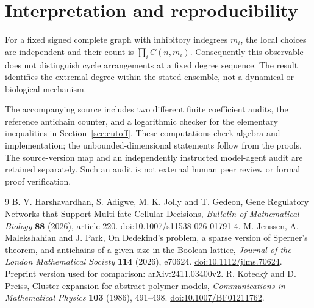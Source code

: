 \documentclass[11pt]{article}
\theoremstyle{remark}\newtheorem{remark}[theorem]{Remark}
\begin{document}
\section{Interpretation and reproducibility}
For a fixed signed complete graph with inhibitory indegrees $m_i$, the
local choices are independent and their count is $\prod_i C(n,m_i)$.
Consequently this observable does not distinguish cycle arrangements
at a fixed degree sequence. The result identifies the extremal degree
within the stated ensemble, not a dynamical or biological mechanism.

The accompanying source includes two different finite coefficient audits,
the reference antichain counter, and a logarithmic checker for the
elementary inequalities in Section~\ref{sec:cutoff}. These computations
check algebra and implementation; the unbounded-dimensional statements
follow from the proofs. The source-version map and an independently
instructed model-agent audit are retained separately. Such an audit is
not external human peer review or formal proof verification.

\begin{thebibliography}{9}
B. V. Harshavardhan, S. Adigwe, M. K. Jolly and T. Gedeon,
Gene Regulatory Networks that Support Multi-fate Cellular Decisions,
\emph{Bulletin of Mathematical Biology} \textbf{88} (2026), article 220.
\href{https://doi.org/10.1007/s11538-026-01791-4}{doi:10.1007/s11538-026-01791-4}.
M. Jenssen, A. Malekshahian and J. Park,
On Dedekind's problem, a sparse version of Sperner's theorem, and antichains
of a given size in the Boolean lattice,
\emph{Journal of the London Mathematical Society} \textbf{114} (2026), e70624.
\href{https://doi.org/10.1112/jlms.70624}{doi:10.1112/jlms.70624}.
Preprint version used for comparison: arXiv:2411.03400v2.
R. Koteck\'{y} and D. Preiss,
Cluster expansion for abstract polymer models,
\emph{Communications in Mathematical Physics} \textbf{103} (1986), 491--498.
\href{https://doi.org/10.1007/BF01211762}{doi:10.1007/BF01211762}.
\end{thebibliography}
\end{document}
